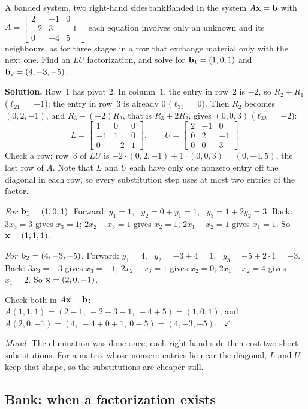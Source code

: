 \documentclass[11pt]{article}
\begin{document}
\begin{exmp}{A banded system, two right-hand sides}{bankBanded}
In the system $A\mathbf{x}=\mathbf{b}$ with $A=\begin{bmatrix}2&-1&0\\-2&3&-1\\0&-4&5\end{bmatrix}$ each equation involves only an unknown and its neighbours, as for three stages in a row that exchange material only with the next one. Find an $LU$ factorization, and solve for $\mathbf{b}_1=(1,0,1)$ and $\mathbf{b}_2=(4,-3,-5)$.

\textbf{Solution.} Row~$1$ has pivot $2$. In column~$1$, the entry in row~$2$ is $-2$, so $R_2+R_1$ ($\ell_{21}=-1$); the entry in row~$3$ is already $0$ ($\ell_{31}=0$). Then $R_2$ becomes $(0,2,-1)$, and $R_3-(-2)R_2$, that is $R_3+2R_2$, gives $(0,0,3)$ ($\ell_{32}=-2$):
\[
L=\begin{bmatrix}1&0&0\\-1&1&0\\0&-2&1\end{bmatrix},\qquad U=\begin{bmatrix}2&-1&0\\0&2&-1\\0&0&3\end{bmatrix}.
\]
Check a row: row~$3$ of $LU$ is $-2\cdot(0,2,-1)+1\cdot(0,0,3)=(0,-4,5)$, the last row of $A$. Note that $L$ and $U$ each have only one nonzero entry off the diagonal in each row, so every substitution step uses at most two entries of the factor.

\emph{For $\mathbf{b}_1=(1,0,1)$.} Forward: $y_1=1$, \ $y_2=0+y_1=1$, \ $y_3=1+2y_2=3$. Back: $3x_3=3$ gives $x_3=1$; $2x_2-x_3=1$ gives $x_2=1$; $2x_1-x_2=1$ gives $x_1=1$. So $\mathbf{x}=(1,1,1)$.

\emph{For $\mathbf{b}_2=(4,-3,-5)$.} Forward: $y_1=4$, \ $y_2=-3+4=1$, \ $y_3=-5+2\cdot1=-3$. Back: $3x_3=-3$ gives $x_3=-1$; $2x_2-x_3=1$ gives $x_2=0$; $2x_1-x_2=4$ gives $x_1=2$. So $\mathbf{x}=(2,0,-1)$.

Check both in $A\mathbf{x}=\mathbf{b}$: $A(1,1,1)=(2-1,\ -2+3-1,\ -4+5)=(1,0,1)$, and $A(2,0,-1)=(4,\ -4+0+1,\ 0-5)=(4,-3,-5)$. \ $\checkmark$

\emph{Moral.} The elimination was done once; each right-hand side then cost two short substitutions. For a matrix whose nonzero entries lie near the diagonal, $L$ and $U$ keep that shape, so the substitutions are cheaper still.
\end{exmp}

\subsection*{Bank: when a factorization exists}
\end{document}

